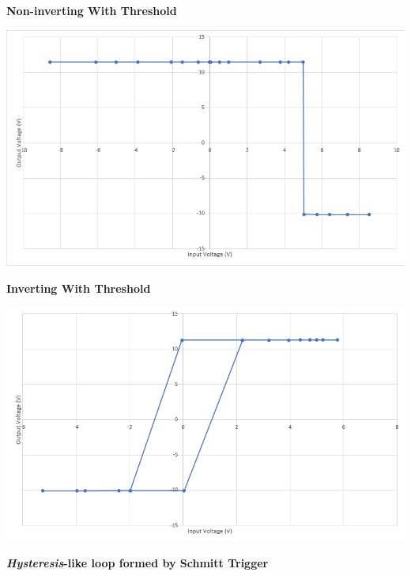 \begin{center}
    \textbf{Non-inverting With Threshold}
\end{center}
\begin{center}
    \includegraphics[scale = 0.7]{OPAMP Apps/invthres.png}
\end{center}
\begin{center}
    \textbf{Inverting With Threshold}
\end{center}
\clearpage
\begin{center}
    \includegraphics[scale = 0.7]{OPAMP Apps/schmitttrigger.png}
\end{center}
\begin{center}
    \textbf{\emph{Hysteresis}-like loop formed by Schmitt Trigger}
\end{center}
